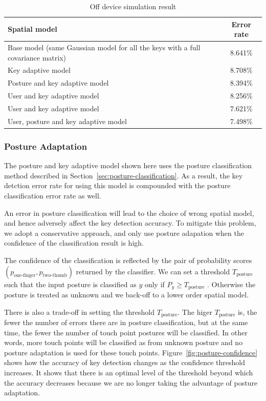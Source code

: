 \documentclass{sigchi}
\newcommand\tabhead[1]{\small\textbf{#1}}
\begin{document}
\begin{table}[tb]
  \centering
  \begin{tabularx}{\columnwidth}{|X|c|}
  \hline
  \tabhead{Spatial model} & \tabhead{Error rate} \\
  \hline
  \multicolumn{1}{|p{0.7\columnwidth}|}{Base model (same Gaussian model for
    all the keys with a full covariance matrix)} & 8.641\% \\
  \hline
  Key adaptive model & 8.708\% \\
  \hline
  Posture and key adaptive model & 8.394\% \\
  \hline
  User and key adaptive model & 8.256\% \\
  \hline
  User and key adaptive model  & 7.621\%
  \\
  \hline
  User, posture and key adaptive model &  7.498\%
  \\
  \hline
  \end{tabularx}
  \caption{Off device simulation result}
  \label{tab:off-device}
\end{table}

\subsubsection{Posture Adaptation}
The posture and key adaptive model shown here uses the posture classification
method described in Section~\ref{sec:posture-classification}. As a result, the
key detction error rate for using this model is compounded with the posture
classification error rate as well. 

An error in posture classification will lead to the choice of wrong spatial model,
and hence adversely affect the key detection accuracy. To mitigate this problem, we
adopt a conservative approach, and only use posture adapation when the confidence of
the classification result is high.

The confidence of the classification is reflected by the pair of probability 
scores $(p_{\text{one-finger}}, p_{\text{two-thumb}})$ returned by the classifier. 
We can set a threshold $T_{\text{posture}}$ such that the input posture is classified
as $y$ only if $P_y \ge T_{\text{posture}}$ . Otherwise the posture is treated as
unknown and we back-off to a lower order spatial model.

There is also a trade-off in setting the threshold $T_{\text{posture}}$. The higer
 $T_{\text{posture}}$ is, the fewer the number of errors there are in posture classification, but at the same time,
 the fewer the number of touch point postures will be classified. In other words, 
 more touch points will be classified as from unknown posture and no posture adaptation 
 is used for these touch points. Figure~\ref{fig:posture-confidence} shows how
 the accuracy of key detection changes as the confidence threshold increases. It 
 shows that there is an optimal level of the threshold beyond which the accuracy
 decreases because we are no longer taking the advantage of posture adaptation.
\end{document}
